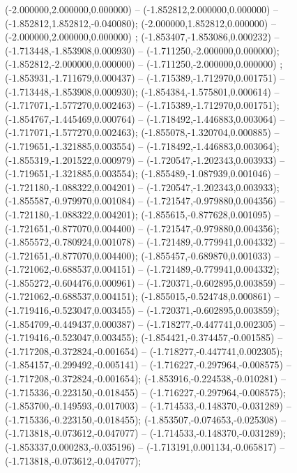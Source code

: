  (-2.000000,2.000000,0.000000) -- (-1.852812,2.000000,0.000000) -- (-1.852812,1.852812,-0.040080);
 (-2.000000,1.852812,0.000000) -- (-2.000000,2.000000,0.000000) ;
 (-1.853407,-1.853086,0.000232) -- (-1.713448,-1.853908,0.000930) -- (-1.711250,-2.000000,0.000000);
 (-1.852812,-2.000000,0.000000) -- (-1.711250,-2.000000,0.000000) ;
 (-1.853931,-1.711679,0.000437) -- (-1.715389,-1.712970,0.001751) -- (-1.713448,-1.853908,0.000930);
 (-1.854384,-1.575801,0.000614) -- (-1.717071,-1.577270,0.002463) -- (-1.715389,-1.712970,0.001751);
 (-1.854767,-1.445469,0.000764) -- (-1.718492,-1.446883,0.003064) -- (-1.717071,-1.577270,0.002463);
 (-1.855078,-1.320704,0.000885) -- (-1.719651,-1.321885,0.003554) -- (-1.718492,-1.446883,0.003064);
 (-1.855319,-1.201522,0.000979) -- (-1.720547,-1.202343,0.003933) -- (-1.719651,-1.321885,0.003554);
 (-1.855489,-1.087939,0.001046) -- (-1.721180,-1.088322,0.004201) -- (-1.720547,-1.202343,0.003933);
 (-1.855587,-0.979970,0.001084) -- (-1.721547,-0.979880,0.004356) -- (-1.721180,-1.088322,0.004201);
 (-1.855615,-0.877628,0.001095) -- (-1.721651,-0.877070,0.004400) -- (-1.721547,-0.979880,0.004356);
 (-1.855572,-0.780924,0.001078) -- (-1.721489,-0.779941,0.004332) -- (-1.721651,-0.877070,0.004400);
 (-1.855457,-0.689870,0.001033) -- (-1.721062,-0.688537,0.004151) -- (-1.721489,-0.779941,0.004332);
 (-1.855272,-0.604476,0.000961) -- (-1.720371,-0.602895,0.003859) -- (-1.721062,-0.688537,0.004151);
 (-1.855015,-0.524748,0.000861) -- (-1.719416,-0.523047,0.003455) -- (-1.720371,-0.602895,0.003859);
 (-1.854709,-0.449437,0.000387) -- (-1.718277,-0.447741,0.002305) -- (-1.719416,-0.523047,0.003455);
 (-1.854421,-0.374457,-0.001585) -- (-1.717208,-0.372824,-0.001654) -- (-1.718277,-0.447741,0.002305);
 (-1.854157,-0.299492,-0.005141) -- (-1.716227,-0.297964,-0.008575) -- (-1.717208,-0.372824,-0.001654);
 (-1.853916,-0.224538,-0.010281) -- (-1.715336,-0.223150,-0.018455) -- (-1.716227,-0.297964,-0.008575);
 (-1.853700,-0.149593,-0.017003) -- (-1.714533,-0.148370,-0.031289) -- (-1.715336,-0.223150,-0.018455);
 (-1.853507,-0.074653,-0.025308) -- (-1.713818,-0.073612,-0.047077) -- (-1.714533,-0.148370,-0.031289);
 (-1.853337,0.000283,-0.035196) -- (-1.713191,0.001134,-0.065817) -- (-1.713818,-0.073612,-0.047077);
